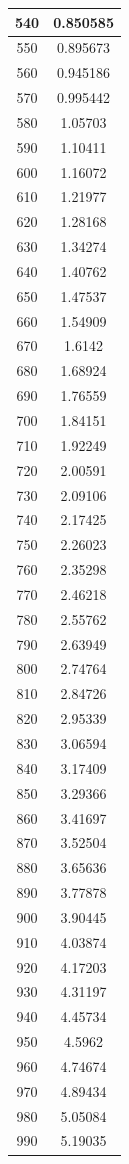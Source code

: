 \documentclass[11pt,spanish]{article} %
\begin{document}
\begin{center}
\begin{longtable}{|c||c|}
540 & 0.850585  \\ \hline
550 & 0.895673  \\ \hline
560 & 0.945186  \\ \hline
570 & 0.995442  \\ \hline
580 & 1.05703   \\ \hline
590 & 1.10411   \\ \hline
600 & 1.16072   \\ \hline
610 & 1.21977   \\ \hline
620 & 1.28168   \\ \hline
630 & 1.34274   \\ \hline
640 & 1.40762   \\ \hline
650 & 1.47537   \\ \hline
660 & 1.54909   \\ \hline
670 & 1.6142    \\ \hline
680 & 1.68924   \\ \hline
690 & 1.76559   \\ \hline
700 & 1.84151   \\ \hline
710 & 1.92249   \\ \hline
720 & 2.00591   \\ \hline
730 & 2.09106   \\ \hline
740 & 2.17425   \\ \hline
750 & 2.26023   \\ \hline
760 & 2.35298   \\ \hline
770 & 2.46218   \\ \hline
780 & 2.55762   \\ \hline
790 & 2.63949   \\ \hline
800 & 2.74764   \\ \hline
810 & 2.84726   \\ \hline
820 & 2.95339   \\ \hline
830 & 3.06594   \\ \hline
840 & 3.17409   \\ \hline
850 & 3.29366   \\ \hline
860 & 3.41697   \\ \hline
870 & 3.52504   \\ \hline
880 & 3.65636   \\ \hline
890 & 3.77878   \\ \hline
900 & 3.90445   \\ \hline
910 & 4.03874   \\ \hline
920 & 4.17203   \\ \hline
930 & 4.31197   \\ \hline
940 & 4.45734   \\ \hline
950 & 4.5962    \\ \hline
960 & 4.74674   \\ \hline
970 & 4.89434   \\ \hline
980 & 5.05084   \\ \hline
990 & 5.19035   \\ \hline
\end{longtable}
\end{center}
\end{document}
